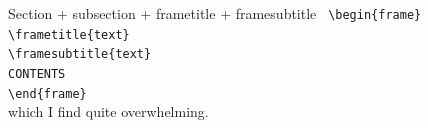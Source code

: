 \documentclass[aspectratio=169]{beamer}
\begin{document}
\begin{frame}[default]
\begin{columns}[t]
\begin{column}{0.48\textwidth}
    \begin{alertblock}{Section + subsection + frametitle + framesubtitle}
      \texttt{%
      \textbackslash begin\{frame\}\\%
      \textbackslash frametitle\{text\}\\
      \textbackslash framesubtitle\{text\}\\
      CONTENTS\\%
      \textbackslash end\{frame\}%
      }\\
      which I find quite overwhelming.
    \end{alertblock}
  \end{column}
\end{columns}

\end{frame}
\end{document}
